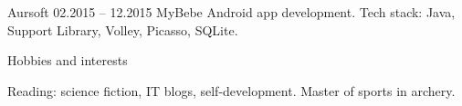 \documentclass[12pt, a4paper]{article}
\begin{document}
\begin{minipage}[t]{0.6\textwidth}
    \bigskip
    
    Aursoft \hfill 02.2015 – 12.2015 \newline
    MyBebe Android app development. \newline
    Tech stack: Java, Support Library, Volley, Picasso, SQLite.

    \bigskip
    
    Hobbies and interests
    
    \bigskip
    
    Reading: science fiction, IT blogs, self-development. Master of sports in archery.
\end{minipage}\\
\end{document}
